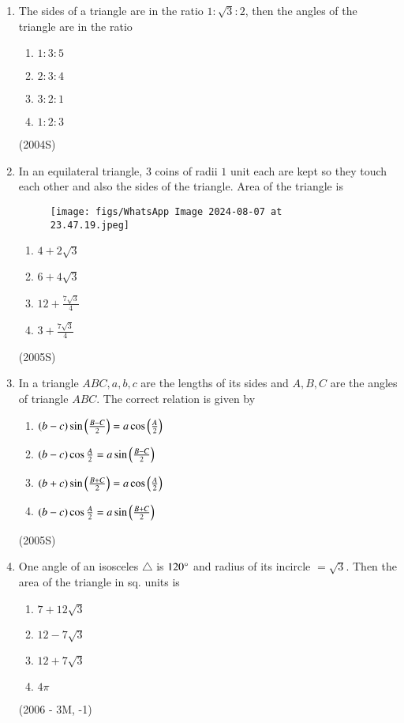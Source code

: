 \documentclass[journal,12pt,twocolumn]{IEEEtran}
\theoremstyle{remark}
\begin{document}
\begin{enumerate}
\item The sides of a triangle are in the ratio $1:\sqrt{3}:2$, then the angles of the triangle are in the ratio
\begin{enumerate}[label = (\alph*)]
\item $1:3:5$
\item $2:3:4$
\item $3:2:1$
\item $1:2:3$
\end{enumerate}
\hfill (2004S)

\item In an equilateral triangle, $3$ coins of radii $1$ unit each are kept so they touch each other and also the sides of the triangle. Area of the triangle is 
\begin{figure}
    \centering
    \texttt{[image: figs/WhatsApp Image 2024-08-07 at 23.47.19.jpeg]}
    \label{fig:enter-label}
\end{figure}
\begin{enumerate}[label = (\alph*)]
\item $4+2\sqrt{3}$
\item $6+4\sqrt{3}$
\item $12+\frac{7\sqrt{3}}{4}$
\item $3+\frac{7\sqrt{3}}{4}$
\end{enumerate}
\hfill (2005S)

\item In a triangle $ABC, a, b, c$  are the lengths of its sides and $A, B, C$ are the angles of triangle $ABC$. The correct relation is given by
\begin{enumerate}[label = (\alph*)]
\item $(b-c)\sin \left(\frac{B-C}{2}\right) = a \cos \left(\frac{A}{2}\right)$
\item $(b-c) \cos \frac{A}{2} = a \sin \left(\frac{B-C}{2}\right)$
\item $(b+c)\sin \left(\frac{B+C}{2}\right) = a \cos \left(\frac{A}{2}\right)$
\item $(b-c) \cos \frac{A}{2} = a \sin \left(\frac{B+C}{2}\right)$
\end{enumerate}
\hfill (2005S)

\item One angle of an isosceles $\triangle$ is $120\degree$ and radius of its incircle $= \sqrt{3}$. Then the area of the triangle in sq. units is 
\begin{enumerate}[label = (\alph*)]
\item $7+12\sqrt{3}$
\item $12-7\sqrt{3}$
\item $12+7\sqrt{3}$
\item $4\pi$
\end{enumerate}
\hfill (2006 - 3M, -1)


\end{enumerate}
\end{document}
